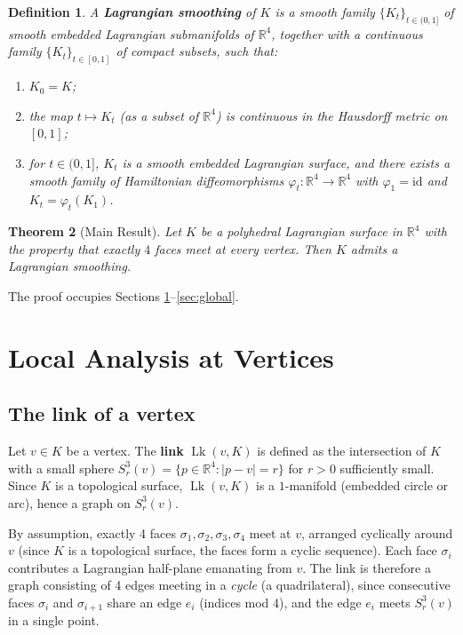 \documentclass[12pt]{article}
\DeclareMathOperator{\Lk}{Lk}
\newtheorem{theorem}{Theorem}[section]
\newtheorem{definition}[theorem]{Definition}
\newcommand{\bR}{\mathbb{R}}
\begin{document}
\begin{definition}
A \textbf{Lagrangian smoothing} of $K$ is a smooth family $\{K_t\}_{t \in (0,1]}$ of smooth embedded Lagrangian submanifolds of $\bR^4$, together with a continuous family $\{K_t\}_{t \in [0,1]}$ of compact subsets, such that:
\begin{enumerate}[label=(\roman*)]
  \item $K_0 = K$;
  \item the map $t \mapsto K_t$ (as a subset of $\bR^4$) is continuous in the Hausdorff metric on $[0,1]$;
  \item for $t \in (0,1]$, $K_t$ is a smooth embedded Lagrangian surface, and there exists a smooth family of Hamiltonian diffeomorphisms $\varphi_t \colon \bR^4 \to \bR^4$ with $\varphi_1 = \mathrm{id}$ and $K_t = \varphi_t(K_1)$.
\end{enumerate}
\end{definition}

\begin{theorem}[Main Result]
\label{thm:main}
Let $K$ be a polyhedral Lagrangian surface in $\bR^4$ with the property that exactly $4$ faces meet at every vertex. Then $K$ admits a Lagrangian smoothing.
\end{theorem}

The proof occupies Sections \ref{sec:vertex}--\ref{sec:global}.

\section{Local Analysis at Vertices}
\label{sec:vertex}

\subsection{The link of a vertex}

Let $v \in K$ be a vertex. The \textbf{link} $\Lk(v, K)$ is defined as the intersection of $K$ with a small sphere $S^3_r(v) = \{p \in \bR^4 : |p - v| = r\}$ for $r > 0$ sufficiently small. Since $K$ is a topological surface, $\Lk(v,K)$ is a $1$-manifold (embedded circle or arc), hence a graph on $S^3_r(v)$.

By assumption, exactly 4 faces $\sigma_1, \sigma_2, \sigma_3, \sigma_4$ meet at $v$, arranged cyclically around $v$ (since $K$ is a topological surface, the faces form a cyclic sequence). Each face $\sigma_i$ contributes a Lagrangian half-plane emanating from $v$. The link is therefore a graph consisting of 4 edges meeting in a \emph{cycle} (a quadrilateral), since consecutive faces $\sigma_i$ and $\sigma_{i+1}$ share an edge $e_i$ (indices mod 4), and the edge $e_i$ meets $S^3_r(v)$ in a single point.
\end{document}
